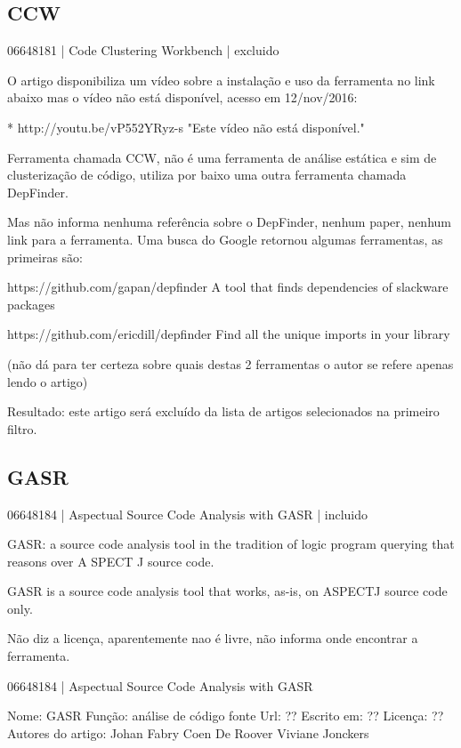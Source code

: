 \subsection{CCW}

06648181 | Code Clustering Workbench | excluido

O artigo disponibiliza um vídeo sobre a instalação e uso da ferramenta no link
abaixo mas o vídeo não está disponível, acesso em 12/nov/2016:

* http://youtu.be/vP552YRyz-s "Este vídeo não está disponível."

Ferramenta chamada CCW, não é uma ferramenta de análise estática e sim de
clusterização de código, utiliza por baixo uma outra ferramenta chamada
DepFinder.

Mas não informa nenhuma referência sobre o DepFinder, nenhum paper, nenhum
link para a ferramenta. Uma busca do Google retornou algumas ferramentas, as
primeiras são:

https://github.com/gapan/depfinder
A tool that finds dependencies of slackware packages

https://github.com/ericdill/depfinder
Find all the unique imports in your library

(não dá para ter certeza sobre quais destas 2 ferramentas o autor se refere
apenas lendo o artigo)

Resultado: este artigo será excluído da lista de artigos selecionados na
primeiro filtro.

\subsection{GASR}

06648184 | Aspectual Source Code Analysis with GASR | incluido

GASR: a source code analysis tool in the tradition of logic program querying
that reasons over A SPECT J source code.

GASR is a source code analysis tool that works, as-is, on ASPECTJ source code only.

Não diz a licença, aparentemente nao é livre, não informa onde encontrar a
ferramenta.

06648184 | Aspectual Source Code Analysis with GASR

Nome: GASR
Função: análise de código fonte
Url: ??
Escrito em: ??
Licença: ??
Autores do artigo: Johan Fabry
                   Coen De Roover
                   Viviane Jonckers



